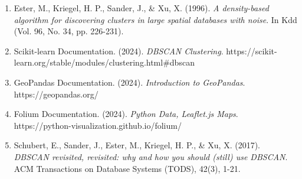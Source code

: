 \documentclass[12pt,a4paper]{article}
\begin{document}
\begin{enumerate}
    \item Ester, M., Kriegel, H. P., Sander, J., \& Xu, X. (1996). \textit{A density-based algorithm for discovering clusters in large spatial databases with noise}. In Kdd (Vol. 96, No. 34, pp. 226-231).
    
    \item Scikit-learn Documentation. (2024). \textit{DBSCAN Clustering}. https://scikit-learn.org/stable/modules/clustering.html\#dbscan
    
    \item GeoPandas Documentation. (2024). \textit{Introduction to GeoPandas}. https://geopandas.org/
    
    \item Folium Documentation. (2024). \textit{Python Data, Leaflet.js Maps}. https://python-visualization.github.io/folium/
    
    \item Schubert, E., Sander, J., Ester, M., Kriegel, H. P., \& Xu, X. (2017). \textit{DBSCAN revisited, revisited: why and how you should (still) use DBSCAN}. ACM Transactions on Database Systems (TODS), 42(3), 1-21.
\end{enumerate}
\end{document}
